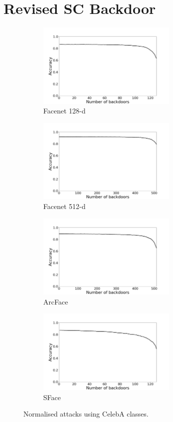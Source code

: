 \documentclass{article}
\theoremstyle{plain}
\theoremstyle{definition}
\theoremstyle{remark}
\begin{document}
\section{Revised SC Backdoor}
\begin{figure}[t!]
    \centering
    \begin{subfigure}[t]{0.45\textwidth}
        \centering
        \includegraphics[height=1.6in]{figures/normalised_attack_Facenet_opencv_cosine_128.png}
        \caption{Facenet 128-d}
    \end{subfigure}%
    \hfill 
    \begin{subfigure}[t]{0.45\textwidth}
        \centering
        \includegraphics[height=1.6in]{figures/normalised_attack_Facenet512_opencv_cosine_512.png}
        \caption{Facenet 512-d}
    \end{subfigure}
    \hfill 
    \begin{subfigure}[t]{0.45\textwidth}
        \centering
        \includegraphics[height=1.6in]{figures/normalised_attack_ArcFace_opencv_cosine_512.png}
        \caption{ArcFace}
    \end{subfigure}
    \hfill 
    \begin{subfigure}[t]{0.45\linewidth}
        \centering
        \includegraphics[height=1.6in]{figures/normalised_attack_SFace_opencv_cosine_128.png}
        \caption{SFace}
    \end{subfigure}
    \caption{Normalised attacks using CelebA classes.}
\end{figure}
\end{document}
